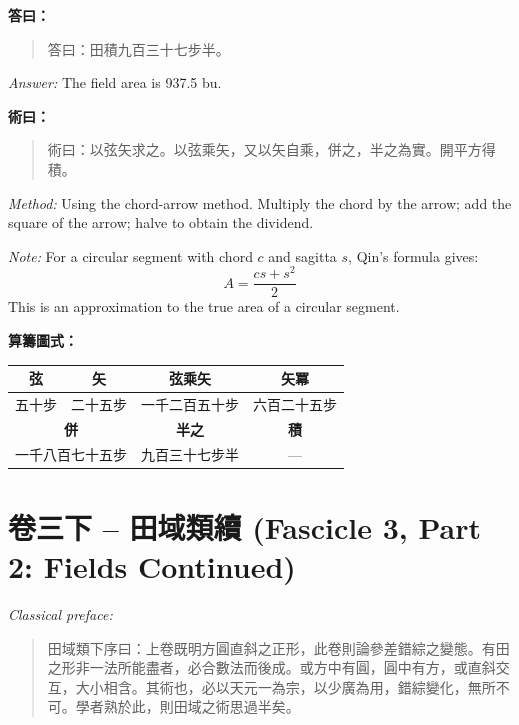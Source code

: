 \documentclass[11pt,a4paper]{article}
\newenvironment{answer}{%
  \medskip\noindent{\color{answercolor}\rule{0.5\textwidth}{0.5pt}}%
  \par\color{answercolor}%
}{%
  \par\medskip%
}
\newenvironment{method}{%
  \medskip\noindent{\color{methodcolor}\rule{0.5\textwidth}{0.5pt}}%
  \par\color{methodcolor}%
}{%
  \par\medskip%
}
\begin{document}
\begin{answer}
\textbf{答曰：}

\begin{quote}
\textcolor{chinacolor}{%
答曰：田積九百三十七步半。
}
\end{quote}

\textit{Answer:} The field area is 937.5 bu.
\end{answer}

\begin{method}
\textbf{術曰：}

\begin{quote}
\textcolor{chinacolor}{%
術曰：以弦矢求之。以弦乘矢，又以矢自乘，併之，半之為實。開平方得積。
}
\end{quote}

\textit{Method:} Using the chord-arrow method. Multiply the chord by the 
arrow; add the square of the arrow; halve to obtain the dividend. 

\medskip
\textit{Note:} For a circular segment with chord $c$ and sagitta $s$, 
Qin's formula gives:
\[
A = \frac{cs + s^2}{2}
\]
This is an approximation to the true area of a circular segment.
\end{method}

\noindent\textbf{算籌圖式：}
\begin{center}
\begin{tabular}{|c|c|c|c|}
\hline
\textbf{弦} & \textbf{矢} & \textbf{弦乘矢} & \textbf{矢冪} \\
\hline
五十步 & 二十五步 & 一千二百五十步 & 六百二十五步 \\
\hline
\multicolumn{2}{|c|}{\textbf{併}} & \textbf{半之} & \textbf{積} \\
\hline
\multicolumn{2}{|c|}{一千八百七十五步} & 九百三十七步半 & --- \\
\hline
\end{tabular}
\end{center}

\newpage

\section{卷三下 -- 田域類續 (Fascicle 3, Part 2: Fields Continued)}
\label{sec:juan3xia}

\noindent\textit{Classical preface:}
\begin{quote}
\textcolor{chinacolor}{%
田域類下序曰：上卷既明方圓直斜之正形，此卷則論參差錯綜之變態。有田之形非一法所能盡者，必合數法而後成。或方中有圓，圓中有方，或直斜交互，大小相含。其術也，必以天元一為宗，以少廣為用，錯綜變化，無所不可。學者熟於此，則田域之術思過半矣。
}
\end{quote}
\end{document}
